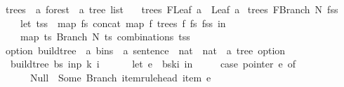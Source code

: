 \begin{isabellebody}
\isanewline
{}\isamarkupfalse%
\ trees\ {\isacharcolon}{\kern0pt}{\isacharcolon}{\kern0pt}\ {\isachardoublequoteopen}{\isacharprime}{\kern0pt}a\ forest\ {\isasymRightarrow}\ {\isacharprime}{\kern0pt}a\ tree\ list{\isachardoublequoteclose}\ \isanewline
\ \ {\isachardoublequoteopen}trees\ {\isacharparenleft}{\kern0pt}FLeaf\ a{\isacharparenright}{\kern0pt}\ {\isacharequal}{\kern0pt}\ {\isacharbrackleft}{\kern0pt}Leaf\ a{\isacharbrackright}{\kern0pt}{\isachardoublequoteclose}\isanewline
{\isacharbar}{\kern0pt}\ {\isachardoublequoteopen}trees\ {\isacharparenleft}{\kern0pt}FBranch\ N\ fss{\isacharparenright}{\kern0pt}\ {\isacharequal}{\kern0pt}\ {\isacharparenleft}{\kern0pt}\isanewline
\ \ \ \ let\ tss\ {\isacharequal}{\kern0pt}\ {\isacharparenleft}{\kern0pt}map\ {\isacharparenleft}{\kern0pt}{\isasymlambda}fs{\isachardot}{\kern0pt}\ concat\ {\isacharparenleft}{\kern0pt}map\ {\isacharparenleft}{\kern0pt}{\isasymlambda}f{\isachardot}{\kern0pt}\ trees\ f{\isacharparenright}{\kern0pt}\ fs{\isacharparenright}{\kern0pt}{\isacharparenright}{\kern0pt}\ fss{\isacharparenright}{\kern0pt}\ in\isanewline
\ \ \ \ map\ {\isacharparenleft}{\kern0pt}{\isasymlambda}ts{\isachardot}{\kern0pt}\ Branch\ N\ ts{\isacharparenright}{\kern0pt}\ {\isacharparenleft}{\kern0pt}combinations\ tss{\isacharparenright}{\kern0pt}\isanewline
\ \ {\isacharparenright}{\kern0pt}{\isachardoublequoteclose}%
\isadelimdocument
%
\endisadelimdocument
%
\isatagdocument
%
\isamarkuptrue%
%
\endisatagdocument
{\isafolddocument}%
%
\isadelimdocument
%
\endisadelimdocument
{}\isamarkupfalse%
\ {\isacharparenleft}{\kern0pt}option{\isacharparenright}{\kern0pt}\ build{\isacharunderscore}{\kern0pt}tree{\isacharprime}{\kern0pt}\ {\isacharcolon}{\kern0pt}{\isacharcolon}{\kern0pt}\ {\isachardoublequoteopen}{\isacharprime}{\kern0pt}a\ bins\ {\isasymRightarrow}\ {\isacharprime}{\kern0pt}a\ sentence\ {\isasymRightarrow}\ nat\ {\isasymRightarrow}\ nat\ {\isasymRightarrow}\ {\isacharprime}{\kern0pt}a\ tree\ option{\isachardoublequoteclose}\ \isanewline
\ \ {\isachardoublequoteopen}build{\isacharunderscore}{\kern0pt}tree{\isacharprime}{\kern0pt}\ bs\ inp\ k\ i\ {\isacharequal}{\kern0pt}\ {\isacharparenleft}{\kern0pt}\isanewline
\ \ \ \ let\ e\ {\isacharequal}{\kern0pt}\ bs{\isacharbang}{\kern0pt}k{\isacharbang}{\kern0pt}i\ in\ {\isacharparenleft}{\kern0pt}\isanewline
\ \ \ \ case\ pointer\ e\ of\isanewline
\ \ \ \ \ \ Null\ {\isasymRightarrow}\ Some\ {\isacharparenleft}{\kern0pt}Branch\ {\isacharparenleft}{\kern0pt}item{\isacharunderscore}{\kern0pt}rule{\isacharunderscore}{\kern0pt}head\ {\isacharparenleft}{\kern0pt}item\ e{\isacharparenright}{\kern0pt}{\isacharparenright}{\kern0pt}\ {\isacharbrackleft}{\kern0pt}{\isacharbrackright}{\kern0pt}{\isacharparenright}{\kern0pt}\isanewline

\end{isabellebody}
